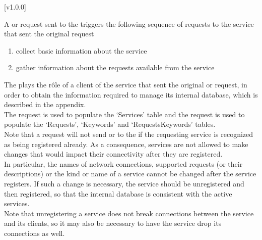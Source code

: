 [v1.0.0]

A  or
 request sent to the
 triggers the following sequence of
requests to the service that sent the original request \longDash{}
\begin{enumerate}
\item\textbf{} collect basic information about the
service
\item\textbf{} gather information about the requests
available from the service
\end{enumerate}
The  plays the r\^ole of a client of the service that
sent the original  or
 request, in order to obtain the information
required to manage its internal database, which is described in the
 appendix.\\

The  request is used to populate the `Services' table
and the  request is used to populate the `Requests',
`Keywords' and `RequestsKeywords' tables.\\

Note that a  request will not send
 or  to the
 if the requesting service is recognized as being
registered already.
As a consequence, services are not allowed to make changes that would impact their
connectivity after they are registered.\\

In particular, the names of \yarp{} network connections, supported requests (or their
descriptions) or the kind or name of a service cannot be changed after the service
registers.
If such a change is necessary, the service should be unregistered and then registered, so
that the internal database is consistent with the active services.\\

Note that unregistering a service does not break connections between the service and its
clients, so it may also be necessary to have the service drop its connections as well.
\appendixEnd{}
